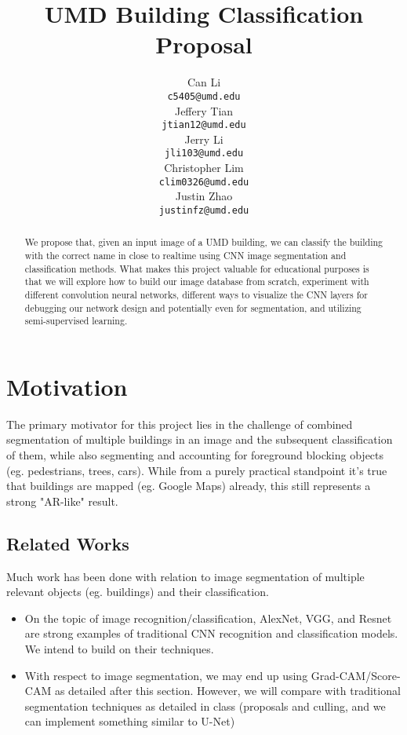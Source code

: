 \documentclass{article}
\title{ UMD Building Classification Proposal }
\author{%
  Can Li \\
  \texttt{c5405@umd.edu} \\
  \And 
  Jeffery Tian \\
  \texttt{jtian12@umd.edu} \\
  \And 
  Jerry Li\\
  \texttt{jli103@umd.edu} \\
  \And 
  Christopher Lim \\
  \texttt{clim0326@umd.edu} \\
  \And 
  Justin Zhao \\
  \texttt{justinfz@umd.edu} \\
}
\begin{document}
\maketitle


\begin{abstract}
  We propose that, given an input image of a UMD building, we can classify the building with the correct name in close to realtime using CNN image segmentation and classification methods. What makes this project valuable for educational purposes is that we will explore how to build our image database from scratch, experiment with different convolution neural networks, different ways to visualize the CNN layers for debugging our network design and potentially even for segmentation, and utilizing semi-supervised learning.
\end{abstract}


\section{Motivation}
\label{motivation}


The primary motivator for this project lies in the challenge of combined segmentation of multiple buildings in an image and the subsequent classification of them, while also segmenting and accounting for foreground blocking objects (eg. pedestrians, trees, cars). While from a purely practical standpoint it's true that buildings are mapped (eg. Google Maps) already, this still represents a strong "AR-like" result.


\subsection{Related Works}

Much work has been done with relation to image segmentation of multiple relevant objects (eg. buildings) and their classification.

\begin{itemize}
    \item On the topic of image recognition/classification, AlexNet, VGG, and Resnet are strong examples of traditional CNN recognition and classification models. We intend to build on their techniques.
    \item With respect to image segmentation, we may end up using Grad-CAM/Score-CAM as detailed after this section. However, we will compare with traditional segmentation techniques as detailed in class (proposals and culling, and we can implement something similar to U-Net)
\end{itemize}
\end{document}
